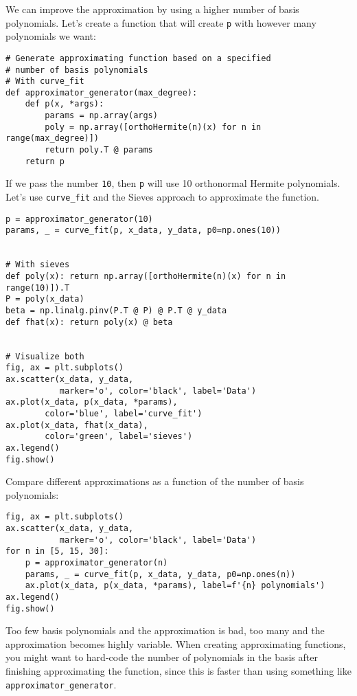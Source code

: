 \documentclass[12pt, a4paper]{article}
\begin{document}
We can improve the approximation by using a higher number of basis polynomials.
Let's create a function that will create \texttt{p} with however many polynomials we want:
\lstset{language=jupyter-python,label= ,caption= ,captionpos=b,numbers=none}
\begin{lstlisting}
# Generate approximating function based on a specified
# number of basis polynomials
# With curve_fit
def approximator_generator(max_degree):
    def p(x, *args):
        params = np.array(args)
        poly = np.array([orthoHermite(n)(x) for n in range(max_degree)])
        return poly.T @ params
    return p
\end{lstlisting}

If we pass the number \texttt{10}, then \texttt{p} will use 10 orthonormal Hermite polynomials.
Let's use \texttt{curve\_fit} and the Sieves approach to approximate the function.
\lstset{language=jupyter-python,label= ,caption= ,captionpos=b,numbers=none}
\begin{lstlisting}
p = approximator_generator(10)
params, _ = curve_fit(p, x_data, y_data, p0=np.ones(10))


# With sieves
def poly(x): return np.array([orthoHermite(n)(x) for n in range(10)]).T
P = poly(x_data)
beta = np.linalg.pinv(P.T @ P) @ P.T @ y_data
def fhat(x): return poly(x) @ beta


# Visualize both
fig, ax = plt.subplots()
ax.scatter(x_data, y_data,
           marker='o', color='black', label='Data')
ax.plot(x_data, p(x_data, *params),
        color='blue', label='curve_fit')
ax.plot(x_data, fhat(x_data),
        color='green', label='sieves')
ax.legend()
fig.show()
\end{lstlisting}

Compare different approximations as a function of the number of basis polynomials:
\lstset{language=jupyter-python,label= ,caption= ,captionpos=b,numbers=none}
\begin{lstlisting}
fig, ax = plt.subplots()
ax.scatter(x_data, y_data,
           marker='o', color='black', label='Data')
for n in [5, 15, 30]:
    p = approximator_generator(n)
    params, _ = curve_fit(p, x_data, y_data, p0=np.ones(n))
    ax.plot(x_data, p(x_data, *params), label=f'{n} polynomials')
ax.legend()
fig.show()
\end{lstlisting}

Too few basis polynomials and the approximation is bad, too many and the approximation becomes highly variable.
When creating approximating functions, you might want to hard-code the number of polynomials in the basis after finishing approximating the function, since this is faster than using something like \texttt{approximator\_generator}.
\end{document}
